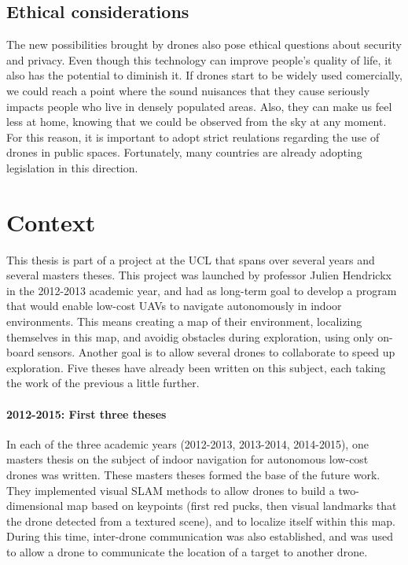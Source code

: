 \subsection{Ethical considerations}
The new possibilities brought by drones also pose ethical questions about security and privacy. Even though this technology can improve people's quality of life, it also has the potential to diminish it. If drones start to be widely used comercially, we could reach a point where the sound nuisances that they cause seriously impacts people who live in densely populated areas. Also, they can make us feel less at home, knowing that we could be observed from the sky at any moment. For this reason, it is important to adopt strict reulations regarding the use of drones in public spaces. Fortunately, many countries are already adopting legislation in this direction.


\section{Context}
This thesis is part of a project at the UCL that spans over several years and several masters theses. This project was launched by professor Julien Hendrickx in the 2012-2013 academic year, and had as long-term goal to develop a program that would enable low-cost UAVs to navigate autonomously in indoor environments. This means creating a map of their environment, localizing themselves in this map, and avoidig obstacles during exploration, using only on-board sensors. Another goal is to allow several drones to collaborate to speed up exploration. Five theses have already been written on this subject, each taking the work of the previous a little further.
\paragraph{2012-2015: First three theses}
In each of the three academic years (2012-2013, 2013-2014, 2014-2015), one masters thesis on the subject of indoor navigation for autonomous low-cost drones was written. These masters theses formed the base of the future work. They implemented visual SLAM methods to allow drones to build a two-dimensional map based on keypoints (first red pucks, then visual landmarks that the drone detected from a textured scene), and to localize itself within this map. During this time, inter-drone communication was also established, and was used to allow a drone to communicate the location of a target to another drone.

